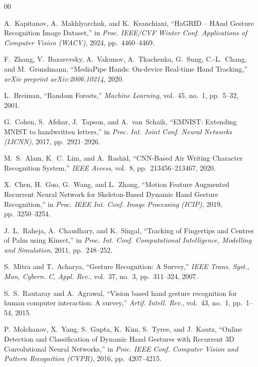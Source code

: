 \documentclass[conference]{IEEEtran}
\begin{document}
\begin{thebibliography}{00}

 A.~Kapitanov, A.~Makhlyarchuk, and K.~Kvanchiani, ``HaGRID -- HAnd Gesture Recognition Image Dataset,'' in \textit{Proc. IEEE/CVF Winter Conf. Applications of Computer Vision (WACV)}, 2024, pp.~4460--4469.

 F.~Zhang, V.~Bazarevsky, A.~Vakunov, A.~Tkachenka, G.~Sung, C.-L.~Chang, and M.~Grundmann, ``MediaPipe Hands: On-device Real-time Hand Tracking,'' \textit{arXiv preprint arXiv:2006.10214}, 2020.

 L.~Breiman, ``Random Forests,'' \textit{Machine Learning}, vol.~45, no.~1, pp.~5--32, 2001.

 G.~Cohen, S.~Afshar, J.~Tapson, and A.~van~Schaik, ``EMNIST: Extending MNIST to handwritten letters,'' in \textit{Proc. Int. Joint Conf. Neural Networks (IJCNN)}, 2017, pp.~2921--2926.

 M.~S.~Alam, K.~C.~Lim, and A.~Rashid, ``CNN-Based Air Writing Character Recognition System,'' \textit{IEEE Access}, vol.~8, pp.~213456--213467, 2020.

 X.~Chen, H.~Guo, G.~Wang, and L.~Zhang, ``Motion Feature Augmented Recurrent Neural Network for Skeleton-Based Dynamic Hand Gesture Recognition,'' in \textit{Proc. IEEE Int. Conf. Image Processing (ICIP)}, 2019, pp.~3250--3254.

 J.~L.~Raheja, A.~Chaudhary, and K.~Singal, ``Tracking of Fingertips and Centres of Palm using Kinect,'' in \textit{Proc. Int. Conf. Computational Intelligence, Modelling and Simulation}, 2011, pp.~248--252.

 S.~Mitra and T.~Acharya, ``Gesture Recognition: A Survey,'' \textit{IEEE Trans. Syst., Man, Cybern. C, Appl. Rev.}, vol.~37, no.~3, pp.~311--324, 2007.

 S.~S.~Rautaray and A.~Agrawal, ``Vision based hand gesture recognition for human computer interaction: A survey,'' \textit{Artif. Intell. Rev.}, vol.~43, no.~1, pp.~1--54, 2015.

 P.~Molchanov, X.~Yang, S.~Gupta, K.~Kim, S.~Tyree, and J.~Kautz, ``Online Detection and Classification of Dynamic Hand Gestures with Recurrent 3D Convolutional Neural Networks,'' in \textit{Proc. IEEE Conf. Computer Vision and Pattern Recognition (CVPR)}, 2016, pp.~4207--4215.


\end{thebibliography}
\end{document}
